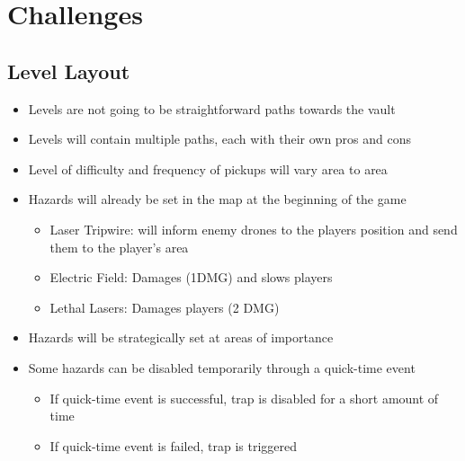 \documentclass[11pt]{report}
\begin{document}
\section{Challenges}    
\subsection{Level Layout}
\begin{itemize}
    \item Levels are not going to be straightforward paths towards the vault
    \item Levels will contain multiple paths, each with their own pros and cons
    \item Level of difficulty and frequency of pickups will vary area to area
    \item Hazards will already be set in the map at the beginning of the game
    \begin{itemize}
        \item Laser Tripwire: will inform enemy drones to the players position and send them to the player's area
        \item Electric Field: Damages (1DMG) and slows players
        \item Lethal Lasers: Damages players (2 DMG)
    \end{itemize}
    \item Hazards will be strategically set at areas of importance
    \item Some hazards can be disabled temporarily through a quick-time event
    \begin{itemize}
        \item If quick-time event is successful, trap is disabled for a short amount of time
        \item If quick-time event is failed, trap is triggered
    \end{itemize}
\end{itemize}
\end{document}
